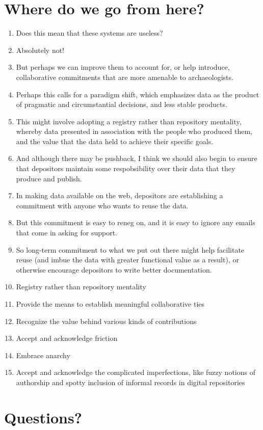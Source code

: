 \documentclass{article}
\begin{document}
\section{Where do we go from here?}
\begin{enumerate}
  \item Does this mean that these systems are useless?
  \item Absolutely not!
  \item But perhaps we can improve them to account for, or help introduce, collaborative commitments that are more amenable to archaeologists.
  \item Perhaps this calls for a paradigm shift, which emphasizes data as the product of pragmatic and circumstantial decisions, and less stable products.
  \item This might involve adopting a registry rather than repository mentality, whereby data presented in association with the people who produced them, and the value that the data held to achieve their specific goals.
  \item And although there may be pushback, I think we should also begin to ensure that depositors maintain some respobsibility over their data that they produce and publish.
  \item In making data available on the web, depositors are establishing a commitment with anyone who wants to reuse the data.
  \item But this commitment is easy to reneg on, and it is easy to ignore any emails that come in asking for support.
  \item So long-term commitment to what we put out there might help facilitate reuse (and imbue the data with greater functional value as a result), or otherwise encourage depositors to write better documentation.
  
  \item Registry rather than repository mentality
  \item Provide the means to establish meaningful collaborative ties
  \item Recognize the value behind various kinds of contributions
  \item Accept and acknowledge friction
  \item Embrace anarchy

  \item Accept and acknowledge the complicated imperfections, like fuzzy notions of authorship and spotty inclusion of informal records in digital repositories
\end{enumerate}



\section{Questions?}
\end{document}
